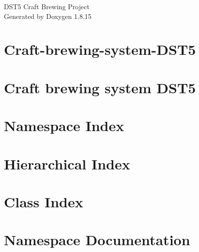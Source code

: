 \let\mypdfximage\pdfximage\def\pdfximage{\immediate\mypdfximage}\documentclass[twoside]{book}
\newcommand{\+}{\discretionary{\mbox{\scriptsize$\hookleftarrow$}}{}{}}
\newcommand{\clearemptydoublepage}{%
  \newpage{\pagestyle{empty}\cleardoublepage}%
}
\begin{document}
\hypersetup{pageanchor=false,
             bookmarksnumbered=true,
             pdfencoding=unicode
            }
\begin{titlepage}
\vspace*{7cm}
\begin{center}%
{\Large D\+S\+T5 Craft Brewing Project }\\
\vspace*{1cm}
{\large Generated by Doxygen 1.8.15}\\
\end{center}
\end{titlepage}
\clearemptydoublepage
{}
\tableofcontents
\clearemptydoublepage
{}
\hypersetup{pageanchor=true}

\chapter{Craft-\/brewing-\/system-\/\+D\+S\+T5}
\label{index}\hypertarget{index}{}
\chapter{Craft brewing system D\+S\+T5}
\label{md__idea}

\chapter{Namespace Index}

\chapter{Hierarchical Index}

\chapter{Class Index}

\chapter{Namespace Documentation}





\end{document}
